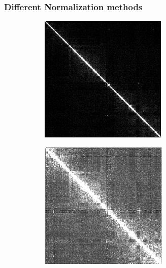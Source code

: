 \documentclass{beamer}
\begin{document}
\begin{frame}
    \frametitle{Different Normalization methods}
    \begin{figure}[H]
        \centering
        \begin{subfigure}[b]{.25\textwidth}
            \includegraphics[width=\textwidth]{figures/original_cleaned.png}
            \caption{}
            \label{fig:original_cleaned}
        \end{subfigure}
        \begin{subfigure}[b]{.25\textwidth}
            \includegraphics[width=\textwidth]{figures/pearson.png}

\end{subfigure}
\end{figure}
\end{frame}
\end{document}
